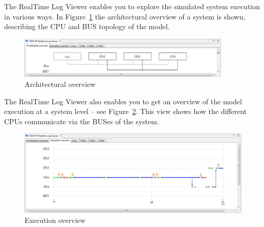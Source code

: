 \documentclass{overturerepchap}
\begin{document}
The RealTime Log Viewer enables
you to explore the simulated system execution in various ways. In
Figure~\ref{fig:userguide:ArchitecturalOverview} the architectural
overview of a system is shown, describing the CPU and BUS topology of
the model.

\begin{figure}[htp]
\begin{center}
  \includegraphics[width=4in]{figures/ArchitectureOverview}
  \caption{Architectural overview}
  \label{fig:userguide:ArchitecturalOverview}
\end{center}
\end{figure}

The RealTime Log Viewer also enables you to get an overview of
the model execution at a system level --
see Figure~\ref{fig:userguide:ExecutionOverview}.
This view shows how the different CPUs communicate via the
BUSes of the system.

\begin{figure}[htp]
\begin{center}
  \includegraphics[width=6in]{figures/ExecutionOverview}
  \caption{Execution overview}
  \label{fig:userguide:ExecutionOverview}
\end{center}
\end{figure}
\end{document}
